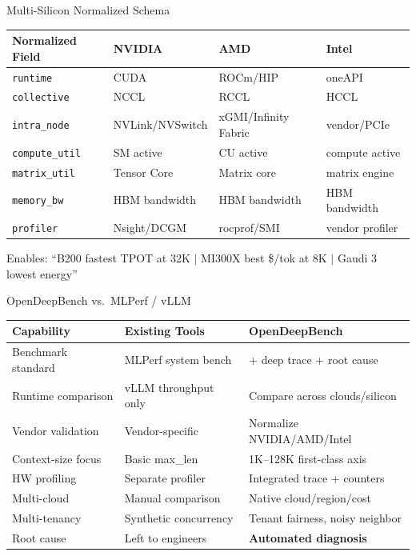 \documentclass[aspectratio=169,10pt]{beamer}
\begin{document}
\begin{frame}{Multi-Silicon Normalized Schema}
\centering
\small
\begin{tabular}{@{}llll@{}}
\toprule
\textbf{Normalized Field} & \textbf{NVIDIA} & \textbf{AMD} & \textbf{Intel} \\
\midrule
\texttt{runtime} & CUDA & ROCm/HIP & oneAPI \\
\texttt{collective} & NCCL & RCCL & HCCL \\
\texttt{intra\_node} & NVLink/NVSwitch & xGMI/Infinity Fabric & vendor/PCIe \\
\texttt{compute\_util} & SM active & CU active & compute active \\
\texttt{matrix\_util} & Tensor Core & Matrix core & matrix engine \\
\texttt{memory\_bw} & HBM bandwidth & HBM bandwidth & HBM bandwidth \\
\texttt{profiler} & Nsight/DCGM & rocprof/SMI & vendor profiler \\
\bottomrule
\end{tabular}

\vspace{0.5em}
Enables: ``\textcolor{nv}{B200} fastest TPOT at 32K $|$ \textcolor{am}{MI300X} best \$/tok at 8K $|$ \textcolor{il}{Gaudi 3} lowest energy''
\end{frame}

\begin{frame}{OpenDeepBench vs.\ MLPerf / vLLM}
\centering
\small
\begin{tabular}{@{}lll@{}}
\toprule
\textbf{Capability} & \textbf{Existing Tools} & \textbf{OpenDeepBench} \\
\midrule
Benchmark standard & MLPerf system bench & + deep trace + root cause \\
Runtime comparison & vLLM throughput only & Compare across clouds/silicon \\
Vendor validation & Vendor-specific & Normalize NVIDIA/AMD/Intel \\
Context-size focus & Basic max\_len & 1K--128K first-class axis \\
HW profiling & Separate profiler & Integrated trace + counters \\
Multi-cloud & Manual comparison & Native cloud/region/cost \\
Multi-tenancy & Synthetic concurrency & Tenant fairness, noisy neighbor \\
Root cause & Left to engineers & \textbf{Automated diagnosis} \\
\bottomrule
\end{tabular}
\end{frame}
\end{document}
